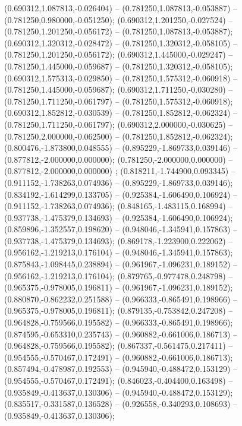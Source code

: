 (0.690312,1.087813,-0.026404) -- (0.781250,1.087813,-0.053887) -- (0.781250,0.980000,-0.051250);
 (0.690312,1.201250,-0.027524) -- (0.781250,1.201250,-0.056172) -- (0.781250,1.087813,-0.053887);
 (0.690312,1.320312,-0.028472) -- (0.781250,1.320312,-0.058105) -- (0.781250,1.201250,-0.056172);
 (0.690312,1.445000,-0.029247) -- (0.781250,1.445000,-0.059687) -- (0.781250,1.320312,-0.058105);
 (0.690312,1.575313,-0.029850) -- (0.781250,1.575312,-0.060918) -- (0.781250,1.445000,-0.059687);
 (0.690312,1.711250,-0.030280) -- (0.781250,1.711250,-0.061797) -- (0.781250,1.575312,-0.060918);
 (0.690312,1.852812,-0.030539) -- (0.781250,1.852812,-0.062324) -- (0.781250,1.711250,-0.061797);
 (0.690312,2.000000,-0.030625) -- (0.781250,2.000000,-0.062500) -- (0.781250,1.852812,-0.062324);
 (0.800476,-1.873800,0.048555) -- (0.895229,-1.869733,0.039146) -- (0.877812,-2.000000,0.000000);
 (0.781250,-2.000000,0.000000) -- (0.877812,-2.000000,0.000000) ;
 (0.818211,-1.744900,0.093345) -- (0.911152,-1.738263,0.074936) -- (0.895229,-1.869733,0.039146);
 (0.834192,-1.614299,0.133705) -- (0.925384,-1.606490,0.106924) -- (0.911152,-1.738263,0.074936);
 (0.848165,-1.483115,0.168994) -- (0.937738,-1.475379,0.134693) -- (0.925384,-1.606490,0.106924);
 (0.859896,-1.352557,0.198620) -- (0.948046,-1.345941,0.157863) -- (0.937738,-1.475379,0.134693);
 (0.869178,-1.223900,0.222062) -- (0.956162,-1.219213,0.176104) -- (0.948046,-1.345941,0.157863);
 (0.875843,-1.098445,0.238894) -- (0.961967,-1.096231,0.189152) -- (0.956162,-1.219213,0.176104);
 (0.879765,-0.977478,0.248798) -- (0.965375,-0.978005,0.196811) -- (0.961967,-1.096231,0.189152);
 (0.880870,-0.862232,0.251588) -- (0.966333,-0.865491,0.198966) -- (0.965375,-0.978005,0.196811);
 (0.879135,-0.753842,0.247208) -- (0.964828,-0.759566,0.195582) -- (0.966333,-0.865491,0.198966);
 (0.874595,-0.653310,0.235743) -- (0.960882,-0.661006,0.186713) -- (0.964828,-0.759566,0.195582);
 (0.867337,-0.561475,0.217411) -- (0.954555,-0.570467,0.172491) -- (0.960882,-0.661006,0.186713);
 (0.857494,-0.478987,0.192553) -- (0.945940,-0.488472,0.153129) -- (0.954555,-0.570467,0.172491);
 (0.846023,-0.404400,0.163498) -- (0.935849,-0.413637,0.130306) -- (0.945940,-0.488472,0.153129);
 (0.835517,-0.331587,0.136528) -- (0.926558,-0.340293,0.108693) -- (0.935849,-0.413637,0.130306);
